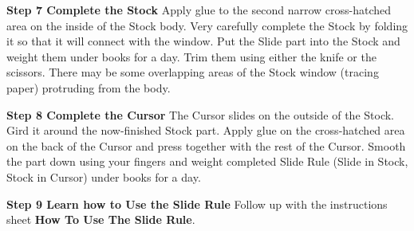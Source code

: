 \documentclass[a4paper,9pt]{article}
\begin{document}
\begin{multicols*}{3}
{  \textbf{Step 7 Complete the Stock} Apply glue to the second narrow cross-hatched area on the inside of the Stock body. Very carefully complete the Stock by folding it so that it will connect with the window. Put the Slide part into the Stock and weight them under books for a day.
Trim them using either the knife or the scissors.
There may be some overlapping areas of the Stock window (tracing paper) protruding from the body. 

  \textbf{Step 8 Complete the Cursor} The Cursor slides on the outside of the Stock. Gird it around the now-finished Stock part. Apply glue on the cross-hatched area on the back of the Cursor and press together with the rest of the Cursor. Smooth the part down using your fingers and weight completed Slide Rule (Slide in Stock, Stock in Cursor) under books for a day.

  \textbf{Step 9 Learn how to Use the Slide Rule} Follow up with the instructions sheet \textbf{How To Use The Slide Rule}.

  }
  \end{multicols*}
  
\end{document}
